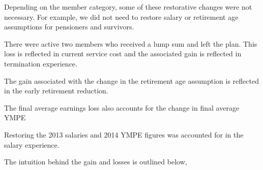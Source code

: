 \documentclass{report}
\begin{document}
\vspace{3mm}
Depending on the member category, some of these restorative changes were not necessary. For example, we did not need to restore salary or retirement age assumptions for pensioners and survivors.

\vspace{3mm}
There were active two members who received a lump sum and left the plan. This loss is reflected in current service cost and the associated gain is reflected in termination experience. 

\vspace{5mm}
The gain associated with the change in the retirement age assumption is reflected in the early retirement reduction. 

\vspace{3mm}
The final average earnings loss also accounts for the change in final average YMPE

\vspace{3mm}
Restoring the 2013 salaries and 2014 YMPE figures was accounted for in the salary experience.

\vspace{3mm}
The intuition behind the gain and losses is outlined below,
\end{document}
